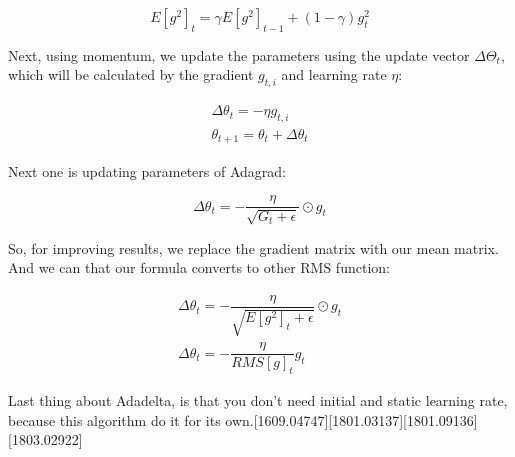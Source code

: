 \begin{equation}
E[g^2]_t = \gamma E[g^2]_{t-1} + (1 - \gamma) g^2_t
\end{equation}

\par Next, using momentum, we update the parameters using the update vector $\Delta\Theta_t$, which will be calculated by the gradient $g_{t,i}$ and learning rate $\eta$:

\begin{equation}
\begin{split}
\Delta\theta_t = - \eta g_{t,i} \\
\theta_{t+1} = \theta_t + \Delta\theta_t
\end{split}
\end{equation}

\par Next one is updating parameters of Adagrad:

\begin{equation}
\Delta\theta_t = - \dfrac{\eta}{\sqrt{G_t+ \epsilon} } \odot g_t
\end{equation}


\par So, for improving results, we replace the gradient matrix with our mean matrix. And we can that our formula converts to other RMS function:

\begin{equation}
\begin{split}
\Delta\theta_t = - \dfrac{\eta}{\sqrt{E[g^2]_t + \epsilon}} \odot g_t \\
\Delta\theta_t = - \dfrac{\eta}{RMS[g]_t} g_t
\end{split}
\end{equation}

\par Last thing about Adadelta, is that you don't need initial and static learning rate, because this algorithm do it for its own.[1609.04747][1801.03137][1801.09136][1803.02922]

